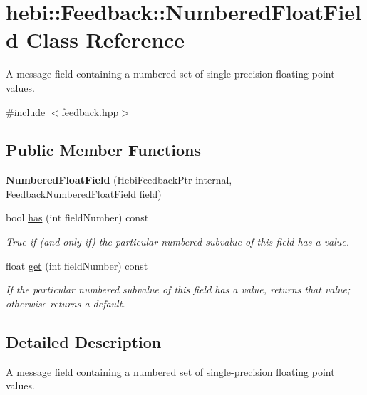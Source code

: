 \hypertarget{classhebi_1_1Feedback_1_1NumberedFloatField}{}\section{hebi\+:\+:Feedback\+:\+:Numbered\+Float\+Field Class Reference}
\label{classhebi_1_1Feedback_1_1NumberedFloatField}


A message field containing a numbered set of single-\/precision floating point values.  




{\ttfamily \#include $<$feedback.\+hpp$>$}

\subsection*{Public Member Functions}
\begin{DoxyCompactItemize}
\item 
\mbox{\label{classhebi_1_1Feedback_1_1NumberedFloatField_ac9d5422a9e1b1eb5ad2a3de5d835f6a4}} 
{\bfseries Numbered\+Float\+Field} (Hebi\+Feedback\+Ptr internal, Feedback\+Numbered\+Float\+Field field)
\item 
bool \hyperlink{classhebi_1_1Feedback_1_1NumberedFloatField_a2a189c6fe371c3ad031b0a8f9f2d49e5}{has} (int field\+Number) const
\begin{DoxyCompactList}\small\item\em True if (and only if) the particular numbered subvalue of this field has a value. \end{DoxyCompactList}\item 
float \hyperlink{classhebi_1_1Feedback_1_1NumberedFloatField_ae92cf1e2ea88f87d69b04b080509be68}{get} (int field\+Number) const
\begin{DoxyCompactList}\small\item\em If the particular numbered subvalue of this field has a value, returns that value; otherwise returns a default. \end{DoxyCompactList}\end{DoxyCompactItemize}


\subsection{Detailed Description}
A message field containing a numbered set of single-\/precision floating point values. 

